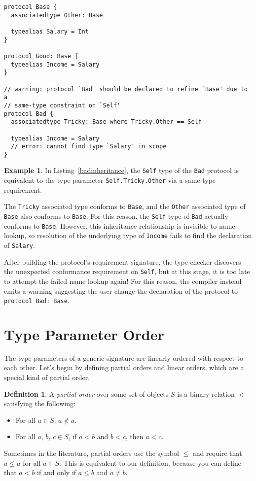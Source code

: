 \documentclass[a4paper,headsepline,bibliography=totoc,toc=flat,fleqn,twoside=semi]{scrbook}
\theoremstyle{definition}
\newtheorem{definition}{Definition}[chapter]
\theoremstyle{definition}
\newtheorem{example}{Example}[chapter]
\theoremstyle{definition}
\begin{document}
\begin{listing}\label{badinheritance}
\begin{Verbatim}
protocol Base {
  associatedtype Other: Base
  
  typealias Salary = Int
}

protocol Good: Base {
  typealias Income = Salary
}

// warning: protocol `Bad' should be declared to refine `Base' due to a
// same-type constraint on `Self'
protocol Bad {
  associatedtype Tricky: Base where Tricky.Other == Self
  
  typealias Income = Salary
  // error: cannot find type `Salary' in scope
}
\end{Verbatim}
\end{listing}
\begin{example}
In Listing~\ref{badinheritance}, the \texttt{Self} type of the \texttt{Bad} protocol is equivalent to the type parameter \texttt{Self.Tricky.Other} via a same-type requirement.

The \texttt{Tricky} associated type conforms to \texttt{Base}, and the \texttt{Other} associated type of \texttt{Base} also conforms to \texttt{Base}. For this reason, the \texttt{Self} type of \texttt{Bad} actually conforms to \texttt{Base}. However, this inheritance relationship is invisible to name lookup, so resolution of the underlying type of \texttt{Income} fails to find the declaration of \texttt{Salary}.

After building the protocol's requirement signature, the type checker discovers the unexpected conformance requirement on \texttt{Self}, but at this stage, it is too late to attempt the failed name lookup again! For this reason, the compiler instead emits a warning suggesting the user change the declaration of the protocol to \texttt{protocol Bad:~Base}.
\end{example}

\section{Type Parameter Order}\label{typeparams}

The type parameters of a generic signature are linearly ordered with respect to each other. Let's begin by defining partial orders and linear orders, which are a special kind of partial order.
\begin{definition} A \emph{partial order} over some set of objects $S$ is a binary relation $<$ satisfying the following:
\begin{itemize}
\item For all $a\in S$, $a\not< a$.
\item For all $a$, $b$, $c\in S$, if $a<b$ and $b<c$, then $a<c$.
\end{itemize}
Sometimes in the literature, partial orders use the symbol $\le$ and require that $a\le a$ for all $a\in S$. This is equivalent to our definition, because you can define that $a<b$ if and only if $a\leq b$ and $a\neq b$.
\end{definition}
\end{document}
